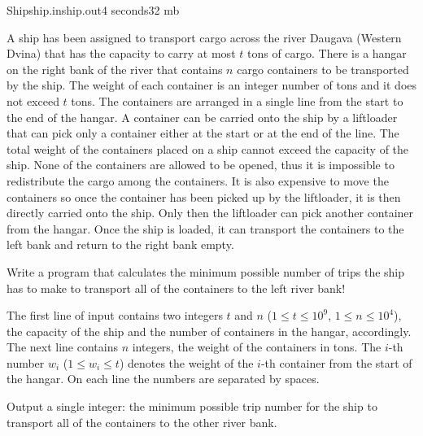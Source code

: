 
\begin{problem}{Ship}{ship.in}{ship.out}{4 seconds}{32 mb}{}

A ship has been assigned to transport cargo across the river Daugava (Western Dvina) that has the capacity to carry at most $t$ tons of cargo. There is a hangar on the right bank of the river that contains $n$ cargo containers to be transported by the ship. The weight of each container is an integer number of tons and it does not exceed $t$ tons. The containers are arranged in a single line from the start to the end of the hangar. A container can be carried onto the ship by a liftloader that can pick only a container either at the start or at the end of the line. The total weight of the containers placed on a ship cannot exceed the capacity of the ship. None of the containers are allowed to be opened, thus it is impossible to redistribute the cargo among the containers. It is also expensive to move the containers so once the container has been picked up by the liftloader, it is then directly carried onto the ship. Only then the liftloader can pick another container from the hangar. Once the ship is loaded, it can transport the containers to the left bank and return to the right bank empty.

Write a program that calculates the minimum possible number of trips the ship has to make to transport all of the containers to the left river bank!

\InputFile
The first line of input contains two integers $t$ and $n$ ($1 \leq t \leq 10^9$, $1 \leq n \leq 10^4$), the capacity of the ship and the number of containers in the hangar, accordingly. The next line contains $n$ integers, the weight of the containers in tons. The $i$-th number $w_i$ ($1 \leq w_i \leq t$) denotes the weight of the $i$-th container from the start of the hangar. On each line the numbers are separated by spaces.

\OutputFile
Output a single integer: the minimum possible trip number for the ship to transport all of the containers to the other river bank.

\Examples

\begin{example}
%
\end{example}


\end{problem}
